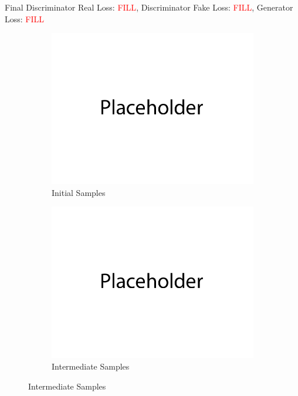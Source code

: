 \documentclass{article}
\begin{document}
Final Discriminator Real Loss: \textcolor{red}{FILL}, Discriminator Fake Loss: \textcolor{red}{FILL}, Generator Loss: \textcolor{red}{FILL}
\begin{figure}[H]
         \centering
         \begin{subfigure}[b]{0.475\textwidth}
             \centering
             \includegraphics[width=\textwidth]{figures/q1_initial_samples.png}
             \caption{Initial Samples}
         \end{subfigure}
         \hfill
         \begin{subfigure}[b]{0.475\textwidth}
             \centering
             \includegraphics[width=\textwidth]{figures/q1_intermediate_samples.png}
             \caption{Intermediate Samples}

\end{subfigure}
\end{figure}
\end{document}
